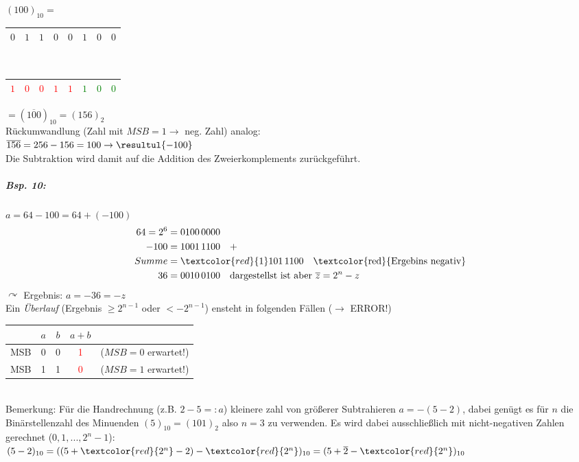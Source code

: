 \begin{enumerate}
\begin{itemize}
\begin{enumerate}[label=\arabic*.)]
$(100)_{10}=$\begin{tabular}{|c|c c c|c c c c|}
\hline
$0$&$1$&$1$&$0$&$0$&$1$&$0$&$0$\\
\hline
\end{tabular}\\
\begin{tabular}{|c|c c c|c c c c|}
\hline
\textcolor{red}{$1$}&\textcolor{red}{$0$}&\textcolor{red}{$0$}&\textcolor{red}{$1$}&\textcolor{red}{$1$}&\textcolor{green}{$1$}&\textcolor{green}{$0$}&\textcolor{green}{$0$}\\
\hline
\end{tabular} $=(\overline{100})_{10}=(156)_2$\\
Rückumwandlung (Zahl mit $MSB=1 \rightarrow$ neg. Zahl) analog:\\
$\overline{156}=256-156=100\rightarrow \resultul{-100}$\\
Die Subtraktion wird damit auf die Addition des Zweierkomplements zurückgeführt.
\end{enumerate}
\subparagraph{Bsp. 10:} $a=64-100=64+(-100)$
\begin{align*}
64=2^6 &= 0100 \, 0000\\
-100 &= 1001 \, 1100 \quad +\\
Summe &= \textcolor{red}{1}101\, 1100 \quad \text{\textcolor{red}{Ergebins negativ}}\\
36 &= 0010\, 0100 \quad \text{dargestellst ist aber }\overline{z}=2^n-z
\end{align*}
$\curvearrowright$ Ergebnis: $a=-36=-z$\\
Ein \emph{Überlauf} (Ergebnis $\geq 2^{n-1}$ oder $<-2^{n-1}$) ensteht in folgenden Fällen ($\rightarrow$ ERROR!)
\begin{tabular}{r | c |c |c l}
 & $a$ & $b$ & $a+b$ & \\
 \hline
 MSB & 0 & 0& \textcolor{red}{1} & ($MSB = 0$ erwartet!)\\
 \hline 
 MSB & 1 & 1& \textcolor{red}{0} & ($MSB = 1$ erwartet!)\\
\end{tabular}\\
Bemerkung: Für die Handrechnung (z.B. $2-5=:a$) kleinere zahl von größerer Subtrahieren $a=-(5-2)$, dabei genügt es für $n$ die Binärstellenzahl des Minuenden $(5)_{10}=(101)_2$ also $n=3$  zu verwenden. Es wird dabei ausschließlich mit nicht-negativen Zahlen gerechnet ($0,1,...,2^n-1$):\\
$(5-2)_{10}=((5+\textcolor{red}{2^n}-2)-\textcolor{red}{2^n})_{10}=(5+\overline{2}-\textcolor{red}{2^n})_{10}$\\

\end{itemize}
\end{enumerate}
